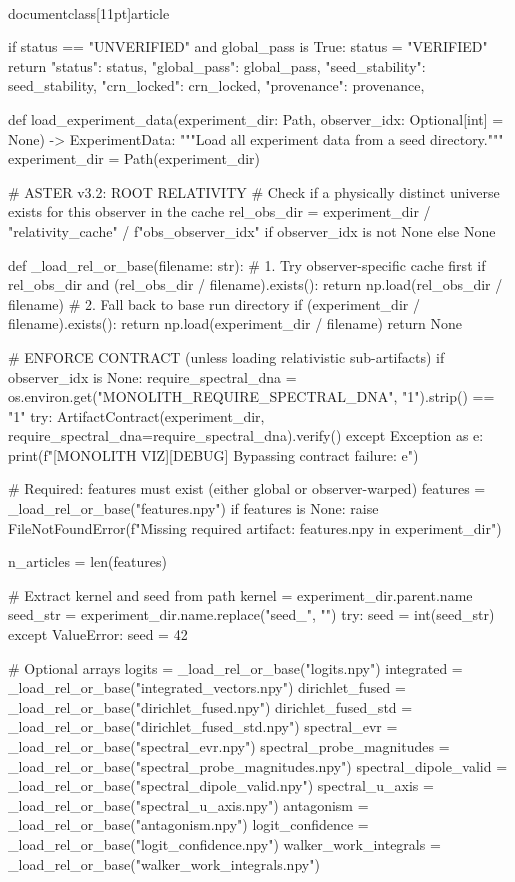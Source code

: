 \\documentclass[11pt]{article}
\begin{document}
\begin{CodeBlock}
    if status == "UNVERIFIED" and global_pass is True:
        status = "VERIFIED"
    return {
        "status": status,
        "global_pass": global_pass,
        "seed_stability": seed_stability,
        "crn_locked": crn_locked,
        "provenance": provenance,
    }


def load_experiment_data(experiment_dir: Path, observer_idx: Optional[int] = None) -> ExperimentData:
    """Load all experiment data from a seed directory."""
    experiment_dir = Path(experiment_dir)
    
    # ASTER v3.2: ROOT RELATIVITY
    # Check if a physically distinct universe exists for this observer in the cache
    rel_obs_dir = experiment_dir / "relativity_cache" / f"obs_{observer_idx}" if observer_idx is not None else None
    
    def _load_rel_or_base(filename: str):
        # 1. Try observer-specific cache first
        if rel_obs_dir and (rel_obs_dir / filename).exists():
            return np.load(rel_obs_dir / filename)
        # 2. Fall back to base run directory
        if (experiment_dir / filename).exists():
            return np.load(experiment_dir / filename)
        return None

    # ENFORCE CONTRACT (unless loading relativistic sub-artifacts)
    if observer_idx is None:
        require_spectral_dna = os.environ.get("MONOLITH_REQUIRE_SPECTRAL_DNA", "1").strip() == "1"
        try:
            ArtifactContract(experiment_dir, require_spectral_dna=require_spectral_dna).verify()
        except Exception as e:
            print(f"[MONOLITH VIZ][DEBUG] Bypassing contract failure: {e}")

    # Required: features must exist (either global or observer-warped)
    features = _load_rel_or_base("features.npy")
    if features is None:
        raise FileNotFoundError(f"Missing required artifact: features.npy in {experiment_dir}")
    
    n_articles = len(features)

    # Extract kernel and seed from path
    kernel = experiment_dir.parent.name
    seed_str = experiment_dir.name.replace("seed_", "")
    try:
        seed = int(seed_str)
    except ValueError:
        seed = 42

    # Optional arrays
    logits = _load_rel_or_base("logits.npy")
    integrated = _load_rel_or_base("integrated_vectors.npy")
    dirichlet_fused = _load_rel_or_base("dirichlet_fused.npy")
    dirichlet_fused_std = _load_rel_or_base("dirichlet_fused_std.npy")
    spectral_evr = _load_rel_or_base("spectral_evr.npy")
    spectral_probe_magnitudes = _load_rel_or_base("spectral_probe_magnitudes.npy")
    spectral_dipole_valid = _load_rel_or_base("spectral_dipole_valid.npy")
    spectral_u_axis = _load_rel_or_base("spectral_u_axis.npy")
    antagonism = _load_rel_or_base("antagonism.npy")
    logit_confidence = _load_rel_or_base("logit_confidence.npy")
    walker_work_integrals = _load_rel_or_base("walker_work_integrals.npy")


\end{CodeBlock}
\end{document}
